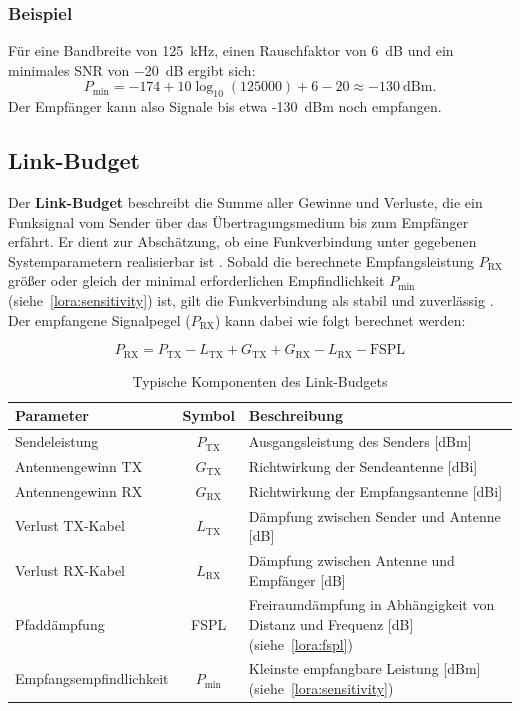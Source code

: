 	
	\subsubsection{Beispiel}
	Für eine Bandbreite von 125~kHz, einen Rauschfaktor von 6~dB und ein minimales SNR von −20~dB ergibt sich:
	\[
	P_\text{min} = -174 + 10\log_{10}(125000) + 6 - 20 \approx -130~\text{dBm}.
	\]
	Der Empfänger kann also Signale bis etwa -130~dBm noch empfangen.
	
	\subsection{Link-Budget \label{lora:linkbudget}}
	Der \textbf{Link-Budget} beschreibt die Summe aller Gewinne und Verluste, die ein Funksignal vom Sender über das Übertragungsmedium bis zum Empfänger erfährt. Er dient zur Abschätzung, ob eine Funkverbindung unter gegebenen Systemparametern realisierbar ist \cite{Semtech:2015}. Sobald die berechnete Empfangsleistung \(P_\text{RX}\) grö{\ss}er oder gleich der minimal erforderlichen Empfindlichkeit \(P_\text{min}\) (siehe~\ref{lora:sensitivity}) ist, gilt die Funkverbindung als stabil und zuverlässig \cite{PaIn:2021}. Der empfangene Signalpegel (\(P_\text{RX}\)) kann dabei wie folgt berechnet werden:
	
	\[
	P_\text{RX} = P_\text{TX} - L_\text{TX} + G_\text{TX} + G_\text{RX} - L_\text{RX} - \text{FSPL}
	\]
	
	\begin{table}[H]
		\centering
		\caption{Typische Komponenten des Link-Budgets}
		\begin{tabular}{l|c|p{6.5cm}}
			\hline
			\textbf{Parameter} & \textbf{Symbol} & \textbf{Beschreibung} \\
			\hline
			Sendeleistung & \(P_\text{TX}\) & Ausgangsleistung des Senders [dBm] \\
			Antennengewinn TX & \(G_\text{TX}\) & Richtwirkung der Sendeantenne [dBi] \\
			Antennengewinn RX & \(G_\text{RX}\) & Richtwirkung der Empfangsantenne [dBi] \\
			Verlust TX-Kabel & \(L_\text{TX}\) & Dämpfung zwischen Sender und Antenne [dB] \\
			Verlust RX-Kabel & \(L_\text{RX}\) & Dämpfung zwischen Antenne und Empfänger [dB] \\
			Pfaddämpfung & FSPL & Freiraumdämpfung in Abhängigkeit von Distanz und Frequenz [dB] (siehe~\ref{lora:fspl})\\
			Empfangsempfindlichkeit & \(P_\text{min}\) & Kleinste empfangbare Leistung [dBm] (siehe~\ref{lora:sensitivity}) \\
			\hline
		\end{tabular}
	\end{table}
	
